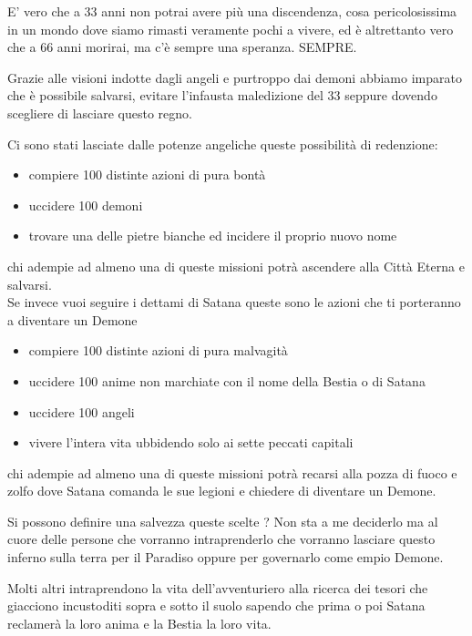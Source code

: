 \documentclass[12pt,a4paper,twoside,openany]{book}
\begin{document}
\begin{multicols}{2}
E' vero che a 33 anni non potrai avere più una discendenza, cosa pericolosissima in un mondo dove siamo rimasti veramente pochi a vivere, ed è altrettanto vero che a 66 anni morirai, ma c'è sempre una speranza. SEMPRE.

Grazie alle visioni indotte dagli angeli e purtroppo dai demoni abbiamo imparato che è possibile salvarsi, evitare l'infausta maledizione del 33 seppure dovendo scegliere di lasciare questo regno.

Ci sono stati lasciate dalle potenze angeliche queste possibilità di redenzione:

\begin{itemize}

\item compiere 100 distinte azioni di pura bontà
\item uccidere 100 demoni
\item trovare una delle pietre bianche ed incidere il proprio nuovo nome

\end{itemize}

chi adempie ad almeno una di queste missioni potrà ascendere alla Città Eterna e salvarsi.\\

Se invece vuoi seguire i dettami di Satana queste sono le azioni che ti porteranno a diventare un Demone

\begin{itemize}

\item compiere 100 distinte azioni di pura malvagità
\item uccidere 100 anime non marchiate con il nome della Bestia o di Satana
\item uccidere 100 angeli
\item vivere l'intera vita ubbidendo solo ai sette peccati capitali

\end{itemize}

chi adempie ad almeno una di queste missioni potrà recarsi alla pozza di fuoco e zolfo dove Satana comanda le sue legioni e chiedere di diventare un Demone.

Si possono definire una salvezza queste scelte ? Non sta a me deciderlo ma al cuore delle persone che vorranno intraprenderlo che vorranno lasciare questo inferno sulla terra per il Paradiso oppure per governarlo come empio Demone.

Molti altri intraprendono la vita dell'avventuriero alla ricerca dei tesori che giacciono incustoditi sopra e sotto il suolo sapendo che prima o poi Satana reclamerà la loro anima e la Bestia la loro vita.



\end{multicols}
\end{document}
